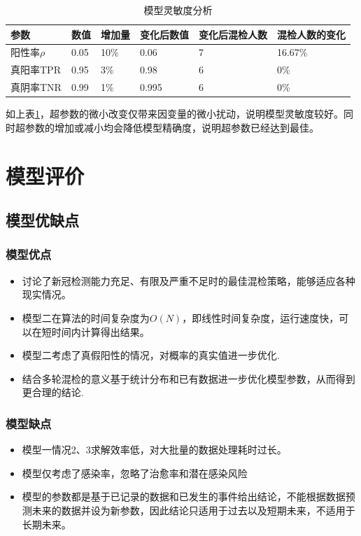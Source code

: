 \documentclass[withoutpreface,bwprint]{cumcmthesis} %
\begin{document}
\begin{table}[H]
\caption{模型灵敏度分析}
\label{模型灵敏度分析}
\centering
\begin{tabular}{llllll}
\toprule
参数 & 数值   & 增加量 & 变化后数值 & 变化后混检人数 & 混检人数的变化\\
\midrule
阳性率$\rho$ & 0.05 & 10$\%$ & 0.06  & 7   & 16.67$\%$  \\
真阳率TPR  & 0.95 & 3\%  & 0.98  & 6   & 0\%   \\
真阴率TNR  & 0.99 & 1\%  & 0.995  & 6   & 0\%  \\
\bottomrule
\end{tabular}
\end{table}

如上表\ref{模型灵敏度分析}，超参数的微小改变仅带来因变量的微小扰动，说明模型灵敏度较好。同时超参数的增加或减小均会降低模型精确度，说明超参数已经达到最佳。


\section{模型评价} %
\subsection{模型优缺点}
\subsubsection{模型优点}
\begin{itemize}
    \item 讨论了新冠检测能力充足、有限及严重不足时的最佳混检策略，能够适应各种现实情况。
    
    \item 模型二在算法的时间复杂度为$O(N)$，即线性时间复杂度，运行速度快，可以在短时间内计算得出结果。
    
    \item 模型二考虑了真假阳性的情况，对概率的真实值进一步优化.
    \item 结合多轮混检的意义基于统计分布和已有数据进一步优化模型参数，从而得到更合理的结论.
\end{itemize}

\subsubsection{模型缺点}
\begin{itemize}
    \item 模型一情况2、3求解效率低，对大批量的数据处理耗时过长。
    
    \item 模型仅考虑了感染率，忽略了治愈率和潜在感染风险
    
    \item 模型的参数都是基于已记录的数据和已发生的事件给出结论，不能根据数据预测未来的数据并设为新参数，因此结论只适用于过去以及短期未来，不适用于长期未来。
\end{itemize}
\end{document}
